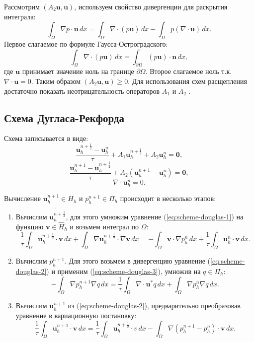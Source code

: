 \documentclass[12pt]{article}
\begin{document}
Рассмотрим  $(A_2 {\bm u}, {\bm u})$, используем свойство дивергенции для раскрытия интеграла:
$$
\int_{\Omega} \nabla p \cdot {\bm u} \, dx = \int_{\Omega} \nabla \cdot (p{\bm u}) \, dx - \int_{\Omega} p (\nabla \cdot {\bm u}) \, dx.
$$
Первое слагаемое по формуле Гаусса-Остроградского:
$$
\int_{\Omega} \nabla \cdot (p{\bm u}) \, dx = \int_{\partial \Omega} (p{\bm u}) \cdot {\bm n} \, dx,
$$ 
где ${\bm u}$ принимает значение ноль на границе $\partial \Omega$. Второе слагаемое ноль т.к. $\nabla \cdot {\bm u} = 0$. Таким образом $(A_2 {\bm u}, {\bm u}) \geq 0$.
Для использования схем расщепления достаточно показать неотрицательность операторов $A_1$ и $A_2$ \cite{vabishchevich-1999}.

\subsection{Схема Дугласа-Рекфорда}
Схема записывается в виде:
\begin{equation} \label{eq:scheme-douglas-1}
\frac{{\bm u}_h^{n + \frac{1}{2}} - {\bm u}_h^n}{\tau} + A_1 {\bm u}_h^{n + \frac{1}{2}}+A_2 {\bm u}_h^n={\bm 0},
\end{equation}
\begin{equation} \label{eq:scheme-douglas-2}
\frac{{\bm u}_h^{n+1}-{\bm u}_h^{n + \frac{1}{2}}}{\tau} + A_2 ({\bm u}_h^{n+1} - {\bm u}_h^{n} )={\bm 0},
\end{equation}
\begin{equation} \label{eq:scheme-douglas-3}
\nabla \cdot {\bm u}_h^n = 0.
\end{equation}

Вычисление ${\bm u}_h^{n+1} \in H_h$ и $p_h^{n+1} \in \Pi_h$ происходит в несколько этапов:
\begin{enumerate}
\item 
Вычислим ${\bm u}_h^{n + \frac{1}{2}}$, для этого умножим уравнение (\ref{eq:scheme-douglas-1}) на функцию ${\bm v} \in \hat H_h$ и возьмем интеграл по $\Omega$:
$$
\frac{1}{\tau}\int_{\Omega} {\bm u}_h^{n + \frac{1}{2}}\cdot {\bm v} \,dx + \int_{\Omega} \nabla {\bm u}_h^{n + \frac{1}{2}} \cdot \nabla {\bm v} \,dx = -\int_{\Omega} {\bm v} \cdot \nabla p_h^{n}\, dx + \frac{1}{\tau} \int_{\Omega} {\bm u}_h^{n} \cdot {\bm v} \,dx.
$$

\item Вычислим $p_h^{n+1}$. Для этого возьмем в дивергенцию уравнение ({\ref{eq:scheme-douglas-2}}) и применим  ({\ref{eq:scheme-douglas-3}}), умножив на $q \in \Pi_h$:
$$
-\int_{\Omega} \nabla p_h^{n+1} \nabla q \,dx = \frac{1}{\tau} \int_{\Omega} \nabla \cdot {\bm u}^* q \,dx + \int_{\Omega} \nabla p_h^{n} \nabla q \,dx.
$$
\item 
Вычислим ${\bm u}_h^{n+1}$ из (\ref{eq:scheme-douglas-2}), предварительно преобразовав уравнение в вариационную постановку:
$$
\frac{1}{\tau} \int_{\Omega} {\bm u}_h^{n+1} \cdot {\bm v}\,dx = \frac{1}{\tau} \int_{\Omega} {\bm u}_h^{n+\frac{1}{2}} \cdot v \,dx - \int_{\Omega} \nabla (p_h^{n+1}-p_h^{n}) \cdot {\bm v} \,dx.
$$
\end{enumerate}
\end{document}
